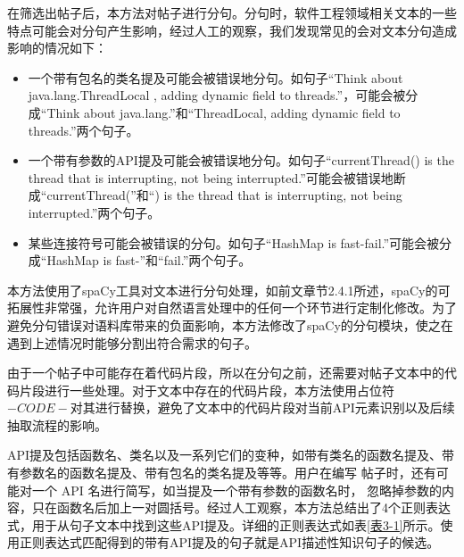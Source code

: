 在筛选出帖子后，本方法对帖子进行分句。分句时，软件工程领域相关文本的一些特点可能会对分句产生影响，经过人工的观察，我们发现常见的会对文本分句造成影响的情况如下：

\begin{itemize}
    \item 一个带有包名的类名提及可能会被错误地分句。如句子“Think about \\java.lang.ThreadLocal , adding dynamic field to threads.”，可能会被分成“Think about java.lang.”和“ThreadLocal, adding dynamic field to threads.”两个句子。
    \item 一个带有参数的API提及可能会被错误地分句。如句子“currentThread() is the thread that is interrupting, not being interrupted.”可能会被错误地断成“currentThread(”和“) is the thread that is interrupting, not being interrupted.”两个句子。
    \item 某些连接符号可能会被错误的分句。如句子“HashMap is fast-fail.”可能会被分成“HashMap is fast-”和“fail.”两个句子。
\end{itemize}

本方法使用了spaCy工具对文本进行分句处理，如前文章节2.4.1所述，spaCy的可拓展性非常强，允许用户对自然语言处理中的任何一个环节进行定制化修改。为了避免分句错误对语料库带来的负面影响，本方法修改了spaCy的分句模块，使之在遇到上述情况时能够分割出符合需求的句子。

由于一个帖子中可能存在着代码片段，所以在分句之前，还需要对帖子文本中的代码片段进行一些处理。对于文本中存在的代码片段，本方法使用占位符$-CODE-$对其进行替换，避免了文本中的代码片段对当前API元素识别以及后续抽取流程的影响。

API提及包括函数名、类名以及一系列它们的变种，如带有类名的函数名提及、带有参数名的函数名提及、带有包名的类名提及等等。用户在编写
帖子时，还有可能对一个 API 名进行简写，如当提及一个带有参数的函数名时，
忽略掉参数的内容，只在函数名后加上一对圆括号。经过人工观察，本方法总结出了4个正则表达式，用于从句子文本中找到这些API提及。详细的正则表达式如表\ref{表3-1}所示。使用正则表达式匹配得到的带有API提及的句子就是API描述性知识句子的候选。

